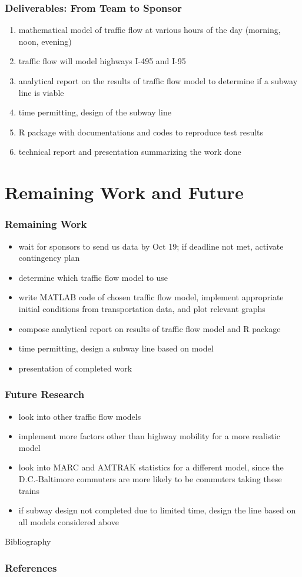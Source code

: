 \documentclass[compress,handout,10pt]{beamer}
\let\olditem\item
\renewcommand{\item}{\setlength{\itemsep}{0.5\baselineskip}\olditem}
\begin{document}
\begin{frame}
    \frametitle{Deliverables: From Team to Sponsor}
    \begin{enumerate}
        \item mathematical model of traffic flow at various hours of the day (morning, noon, evening)
	\item traffic flow will model highways I-495 and I-95
	\item analytical report on the results of traffic flow model to determine if a subway line is viable
	\item time permitting, design of the subway line
	\item R package with documentations and codes to reproduce test results
	\item technical report and presentation summarizing the work done
    \end{enumerate}
\end{frame}

\section{Remaining Work and Future}
\begin{frame}
    \frametitle{Remaining Work}
	\begin{itemize}
	\item wait for sponsors to send us data by Oct 19; if deadline not met, activate contingency plan
	\item determine which traffic flow model to use
	\item write MATLAB code of chosen traffic flow model, implement appropriate initial conditions from transportation data, and plot relevant graphs
	\item compose analytical report on results of traffic flow model and R package
	\item time permitting, design a subway line based on model
	\item presentation of completed work
	\end{itemize}
\end{frame}

\begin{frame}
    \frametitle{Future Research}
	\begin{itemize}
	\item look into other traffic flow models
	\item implement more factors other than highway mobility for a more realistic model
	\item look into MARC and AMTRAK statistics for a different model, since the D.C.-Baltimore commuters are more likely to be commuters taking these trains
	\item if subway design not completed due to limited time, design the line based on all models considered above
	\end{itemize}
\end{frame}

\begin{frame}[allowframebreaks]{Bibliography}
\frametitle{References}

\nocite{*}

\end{frame}
\end{document}

